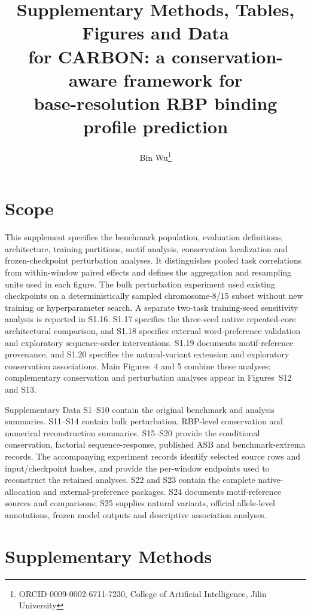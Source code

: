 \documentclass[11pt]{article}
\title{Supplementary Methods, Tables, Figures and Data\\for CARBON: a conservation-aware framework for\\base-resolution RBP binding profile prediction}
\author{Bin Wu\thanks{ORCID 0009-0002-6711-7230, College of Artificial Intelligence, Jilin University}}
\date{}
\begin{document}
\renewcommand{\thefigure}{S\arabic{figure}}
\renewcommand{\thetable}{S\arabic{table}}
\maketitle

\section*{Scope}

This supplement specifies the benchmark population, evaluation definitions, architecture, training partitions, motif analysis, conservation localization and frozen-checkpoint perturbation analyses. It distinguishes pooled task correlations from within-window paired effects and defines the aggregation and resampling units used in each figure. The bulk perturbation experiment used existing checkpoints on a deterministically sampled chromosome-8/15 subset without new training or hyperparameter search. A separate two-task training-seed sensitivity analysis is reported in S1.16. S1.17 specifies the three-seed native repeated-core architectural comparison, and S1.18 specifies external word-preference validation and exploratory sequence-order interventions. S1.19 documents motif-reference provenance, and S1.20 specifies the natural-variant extension and exploratory conservation associations. Main Figures~4 and 5 combine these analyses; complementary conservation and perturbation analyses appear in Figures~S12 and S13.

Supplementary Data S1--S10 contain the original benchmark and analysis summaries. S11--S14 contain bulk perturbation, RBP-level conservation and numerical reconstruction summaries. S15--S20 provide the conditional conservation, factorial sequence-response, published ASB and benchmark-extrema records. The accompanying experiment records identify selected source rows and input/checkpoint hashes, and provide the per-window endpoints used to reconstruct the retained analyses. S22 and S23 contain the complete native-allocation and external-preference packages. S24 documents motif-reference sources and comparisons; S25 supplies natural variants, official allele-level annotations, frozen model outputs and descriptive association analyses.

\section{Supplementary Methods}
\end{document}
